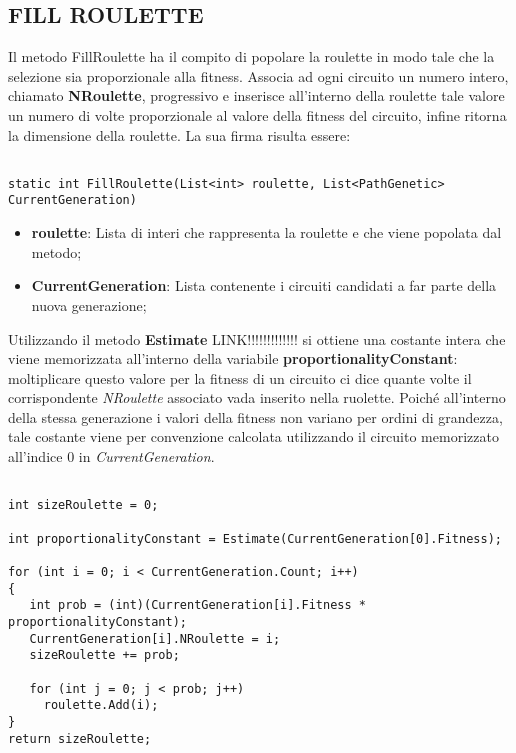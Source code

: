 \documentclass[11pt]{article}
\begin{document}
\subsection*{FILL ROULETTE}
\label{sec:FillRouletteS}

Il metodo FillRoulette ha il compito di popolare la roulette in modo tale che la selezione sia proporzionale alla fitness. Associa ad ogni circuito un numero intero, chiamato \textbf{NRoulette}, progressivo e inserisce all'interno della roulette tale valore un numero di volte proporzionale al valore della fitness del circuito, infine ritorna la dimensione della roulette. La sua firma risulta essere:

\begin{lstlisting}

static int FillRoulette(List<int> roulette, List<PathGenetic> CurrentGeneration)

\end{lstlisting}

\begin{itemize}
    \item \textbf{roulette}: Lista di interi che rappresenta la roulette e che viene popolata dal metodo;
    \item \textbf{CurrentGeneration}: Lista contenente i circuiti candidati a far parte della nuova generazione;
\end{itemize}

Utilizzando il metodo \textbf{Estimate} LINK!!!!!!!!!!!!! si ottiene una costante intera che viene memorizzata all'interno della variabile \textbf{proportionalityConstant}: moltiplicare questo valore per la fitness di un circuito ci dice quante volte il corrispondente \textit{NRoulette} associato vada inserito nella ruolette. Poiché all'interno della stessa generazione i valori della fitness non variano per ordini di grandezza, tale costante viene per convenzione calcolata utilizzando il circuito memorizzato all'indice $0$ in \textit{CurrentGeneration}.
\begin{lstlisting}

int sizeRoulette = 0;
            
int proportionalityConstant = Estimate(CurrentGeneration[0].Fitness);

for (int i = 0; i < CurrentGeneration.Count; i++)
{
   int prob = (int)(CurrentGeneration[i].Fitness * proportionalityConstant);
   CurrentGeneration[i].NRoulette = i;
   sizeRoulette += prob;
   
   for (int j = 0; j < prob; j++)
     roulette.Add(i);
}
return sizeRoulette;

\end{lstlisting}
\end{document}
